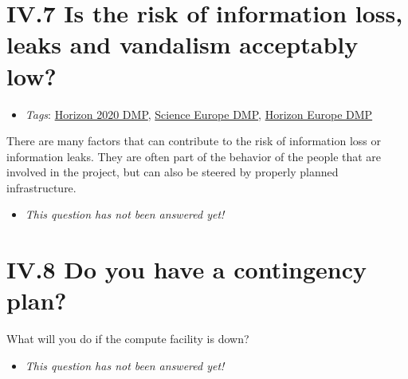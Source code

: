 \documentclass[a4paper,12pt]{report}
\begin{document}
\section*{\protect\textcolor{colorSecId}{IV.7} Is the risk of information loss, leaks and vandalism acceptably low?}

\label{10a10ffd-bfe1-4c6b-bbb6-3dfb1e63a5d5.614ab69d-55a6-4214-b384-00ba21ce92a1}


\begin{itemize}
  \item \textit{Tags}: \ul{Horizon 2020 DMP}, \ul{Science Europe DMP}, \ul{Horizon Europe DMP}
  \end{itemize}


\noindent
\begin{markdown}
There are many factors that can contribute to the risk of information loss or information leaks. They are often part of the behavior of the people that are involved in the project, but can also be steered by properly planned infrastructure.
\end{markdown}



\begin{itemize}
  \item[\XSolidBrush] \textit{This question has not been answered yet!}
\end{itemize}
  


\section*{\protect\textcolor{colorSecId}{IV.8} Do you have a contingency plan?}

\label{10a10ffd-bfe1-4c6b-bbb6-3dfb1e63a5d5.acc82522-327a-4c76-8c24-f8034f7dc1d4}




\noindent
\begin{markdown}
What will you do if the compute facility is down?
\end{markdown}



\begin{itemize}
  \item[\XSolidBrush] \textit{This question has not been answered yet!}
\end{itemize}
  
\end{document}
